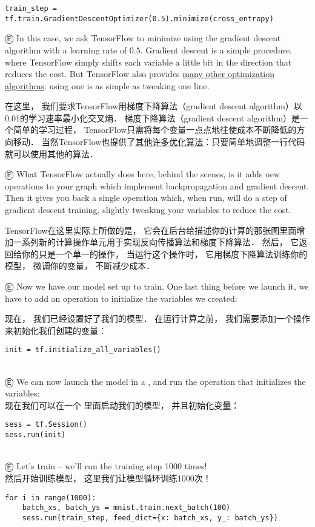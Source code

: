 \begin{lstlisting}
train_step = tf.train.GradientDescentOptimizer(0.5).minimize(cross_entropy)
\end{lstlisting}

Ⓔ In this case, we ask TensorFlow to minimize  using the gradient descent algorithm with a learning rate of $0.5$. Gradient descent is a simple procedure, where TensorFlow simply shifts each variable a little bit in the direction that reduces the cost. But TensorFlow also provides \href{https://www.tensorflow.org/versions/master/api_docs/python/train.html#optimizers}{many other optimization algorithms}: using one is as simple as tweaking one line.

在这里， 我们要求TensorFlow用梯度下降算法（gradient descent algorithm）以0.01的学习速率最小化交叉熵．  梯度下降算法（gradient descent algorithm）是一个简单的学习过程， TensorFlow只需将每个变量一点点地往使成本不断降低的方向移动．  当然TensorFlow也提供了\href{https://www.tensorflow.org/versions/master/api_docs/python/train.html#optimizers}{其他许多优化算法}：只要简单地调整一行代码就可以使用其他的算法．  

Ⓔ What TensorFlow actually does here, behind the scenes, is it adds new operations to your graph which implement backpropagation and gradient descent. Then it gives you back a single operation which, when run, will do a step of gradient descent training, slightly tweaking your variables to reduce the cost.

TensorFlow在这里实际上所做的是， 它会在后台给描述你的计算的那张图里面增加一系列新的计算操作单元用于实现反向传播算法和梯度下降算法．  然后， 它返回给你的只是一个单一的操作， 当运行这个操作时， 它用梯度下降算法训练你的模型， 微调你的变量， 不断减少成本．

Ⓔ Now we have our model set up to train. One last thing before we launch it, we have to add an operation to initialize the variables we created:

现在， 我们已经设置好了我们的模型．  在运行计算之前， 我们需要添加一个操作来初始化我们创建的变量：

\begin{lstlisting}
init = tf.initialize_all_variables()
\end{lstlisting}
\\
Ⓔ We can now launch the model in a , and run the operation that initializes the variables:\\
现在我们可以在一个  里面启动我们的模型， 并且初始化变量：
\begin{lstlisting}
sess = tf.Session()
sess.run(init)
\end{lstlisting}
\\
Ⓔ Let's train -- we'll run the training step 1000 times!\\
然后开始训练模型， 这里我们让模型循环训练1000次！
\begin{lstlisting}
for i in range(1000):
    batch_xs, batch_ys = mnist.train.next_batch(100)
    sess.run(train_step, feed_dict={x: batch_xs, y_: batch_ys})
\end{lstlisting}

